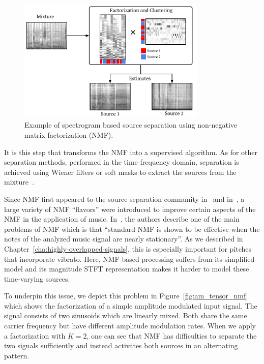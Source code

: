 \begin{figure}[h]
  \centering
  \includegraphics[width=0.8\textwidth]{Chapters/06_Separation_Unknown/figures/nmf_separation.pdf}
  \caption{Example of spectrogram based source separation using non-negative matrix factorization (NMF).}
  \label{fig:nmf_separation}
\end{figure}

It is this step that transforms the NMF into a supervised algorithm.
As for other separation methods, performed in the time-frequency domain, separation is achieved using Wiener filters or soft masks to extract the sources from the mixture~\cite{liutkus15c}.
\par
Since NMF first appeared to the source separation community in~\cite{smaragdis03} and in~\cite{vembu05}, a large variety of NMF ``flavors'' were introduced to improve certain aspects of the NMF in the application of music. 
In~\cite[Chapter 16]{vincent}, the authors describe one of the main problems of NMF which is that ``standard NMF is shown to be effective when the notes of the analyzed music signal are nearly stationary''.
As we described in Chapter~\ref{cha:highly-overlapped-signals}, this is especially important for pitches that incorporate vibrato.
Here, NMF-based processing suffers from its simplified model and its magnitude STFT representation makes it harder to model these time-varying sources.
\par
To underpin this issue, we depict this problem in Figure~\ref{fig:am_tensor_nmf} which shows the factorization of a simple amplitude modulated input signal. 
The signal consists of two sinusoids which are linearly mixed. 
Both share the same carrier frequency but have different amplitude modulation rates. 
When we apply a factorization with $K=2$, one can see that NMF has difficulties to separate the two signals sufficiently and instead activates both sources in an alternating pattern.

